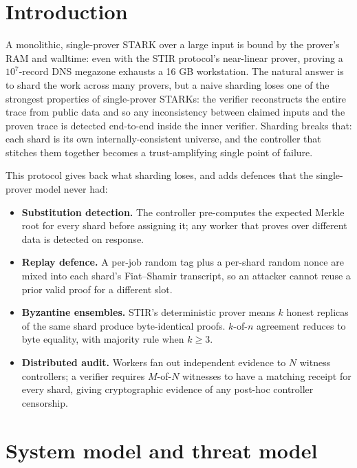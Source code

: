 \documentclass[11pt,a4paper]{article}
\theoremstyle{definition}
\theoremstyle{plain}
\begin{document}
\section{Introduction}
\label{sec:intro}

A monolithic, single-prover STARK over a large input is bound by the
prover's RAM and walltime: even with the STIR protocol's near-linear
prover, proving a $10^7$-record DNS megazone exhausts a 16 GB workstation.
The natural answer is to shard the work across many provers, but a naive
sharding loses one of the strongest properties of single-prover STARKs:
the verifier reconstructs the entire trace from public data and so any
inconsistency between claimed inputs and the proven trace is detected
end-to-end inside the inner verifier.  Sharding breaks that: each shard
is its own internally-consistent universe, and the controller that stitches
them together becomes a trust-amplifying single point of failure.

This protocol gives back what sharding loses, and adds defences that the
single-prover model never had:
\begin{itemize}[leftmargin=*]
  \item \textbf{Substitution detection.}  The controller pre-computes the
        expected Merkle root for every shard before assigning it; any
        worker that proves over different data is detected on response.
  \item \textbf{Replay defence.}  A per-job random tag plus a per-shard
        random nonce are mixed into each shard's Fiat--Shamir transcript,
        so an attacker cannot reuse a prior valid proof for a different
        slot.
  \item \textbf{Byzantine ensembles.}  STIR's deterministic prover means
        $k$ honest replicas of the same shard produce byte-identical
        proofs.  $k$-of-$n$ agreement reduces to byte equality, with
        majority rule when $k \ge 3$.
  \item \textbf{Distributed audit.}  Workers fan out independent evidence
        to $N$ witness controllers; a verifier requires $M$-of-$N$
        witnesses to have a matching receipt for every shard, giving
        cryptographic evidence of any post-hoc controller censorship.
\end{itemize}

\section{System model and threat model}
\label{sec:threats}
\end{document}
